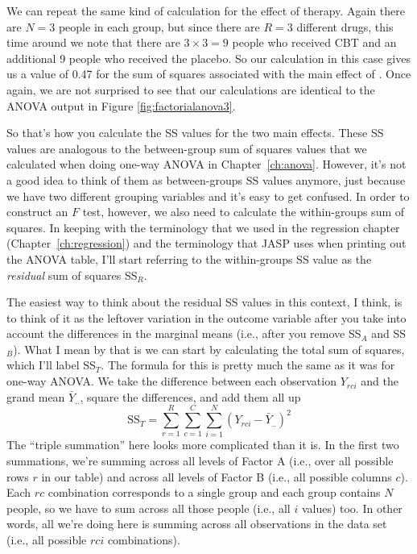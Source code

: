 \begin{mdframed}[style=MyFrame,nobreak=false]
We can repeat the same kind of calculation for the effect of therapy. Again there are $N=3$ people in each group, but since there are $R=3$ different drugs, this time around we note that there are $3 \times 3 = 9$ people who received CBT and an additional 9 people who received the placebo. So our calculation in this case gives us a value of 0.47 for the sum of squares associated with the main effect of . Once again, we are not surprised to see that our calculations are identical to the ANOVA output in Figure \ref{fig:factorialanova3}. 

So that's how you calculate the SS values for the two main effects. These SS values are analogous to the between-group sum of squares values that we calculated when doing one-way ANOVA in Chapter~\ref{ch:anova}. However, it's not a good idea to think of them as between-groups SS values anymore, just because we have two different grouping variables and it's easy to get confused. In order to construct an $F$ test, however, we also need to calculate the within-groups sum of squares. In keeping with the terminology that we used in the regression chapter (Chapter~\ref{ch:regression}) and the terminology that JASP uses when printing out the ANOVA table, I'll start referring to the within-groups SS value as the {\it residual} sum of squares SS$_R$. 

The easiest way to think about the residual SS values in this context, I think, is to think of it as the leftover variation in the outcome variable after you take into account the differences in the marginal means (i.e., after you remove SS$_A$ and SS$_B$). What I mean by that is we can start by calculating the total sum of squares, which I'll label SS$_T$. The formula for this is pretty much the same as it was for one-way ANOVA. We take the difference between each observation $Y_{rci}$ and the grand mean $\bar{Y}_{..}$, square the differences, and add them all up
$$
\mbox{SS}_T = \sum_{r=1}^R \sum_{c=1}^C \sum_{i=1}^N \left( Y_{rci} - \bar{Y}_{..}\right)^2
$$
The ``triple summation'' here looks more complicated than it is. In the first two summations, we're summing across all levels of Factor A (i.e., over all possible rows $r$ in our table) and across all levels of Factor B (i.e., all possible columns $c$). Each $rc$ combination corresponds to a single group and each group contains $N$ people, so we have to sum across all those people (i.e., all $i$ values) too. In other words, all we're doing here is summing across all observations in the data set (i.e., all possible $rci$ combinations). 


\end{mdframed}
